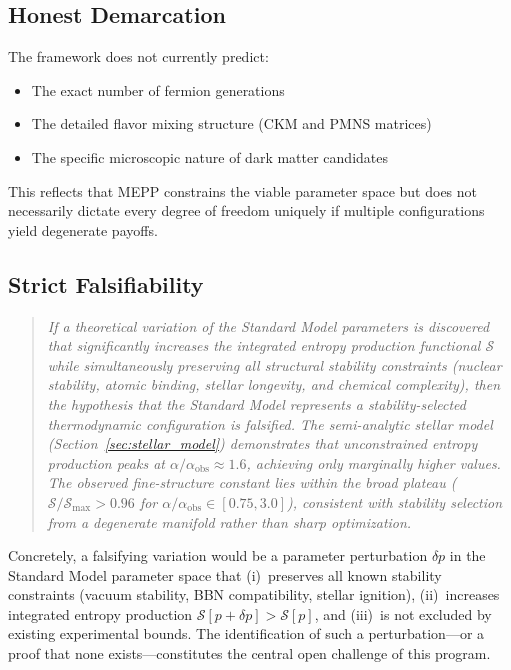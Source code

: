 \documentclass[12pt,a4paper]{article}
\theoremstyle{remark}
\begin{document}
\subsection{Honest Demarcation}

The framework does not currently predict:
\begin{itemize}
    \item The exact number of fermion generations
    \item The detailed flavor mixing structure (CKM and PMNS matrices)
    \item The specific microscopic nature of dark matter candidates
\end{itemize}

This reflects that MEPP constrains the viable parameter space but does not necessarily dictate every degree of freedom uniquely if multiple configurations yield degenerate payoffs.

\subsection{Strict Falsifiability}

\begin{quote}
\textit{If a theoretical variation of the Standard Model parameters is discovered that significantly increases the integrated entropy production functional $\mathcal{S}$ while simultaneously preserving all structural stability constraints (nuclear stability, atomic binding, stellar longevity, and chemical complexity), then the hypothesis that the Standard Model represents a stability-selected thermodynamic configuration is falsified. The semi-analytic stellar model (Section~\ref{sec:stellar_model}) demonstrates that unconstrained entropy production peaks at $\alpha/\alpha_{\mathrm{obs}} \approx 1.6$, achieving only marginally higher values. The observed fine-structure constant lies within the broad plateau ($\mathcal{S}/\mathcal{S}_{\max} > 0.96$ for $\alpha/\alpha_{\mathrm{obs}} \in [0.75, 3.0]$), consistent with stability selection from a degenerate manifold rather than sharp optimization.}
\end{quote}

\noindent Concretely, a falsifying variation would be a parameter perturbation $\delta p$ in the Standard Model parameter space that (i)~preserves all known stability constraints (vacuum stability, BBN compatibility, stellar ignition), (ii)~increases integrated entropy production $\mathcal{S}[p + \delta p] > \mathcal{S}[p]$, and (iii)~is not excluded by existing experimental bounds. The identification of such a perturbation---or a proof that none exists---constitutes the central open challenge of this program.
\end{document}
